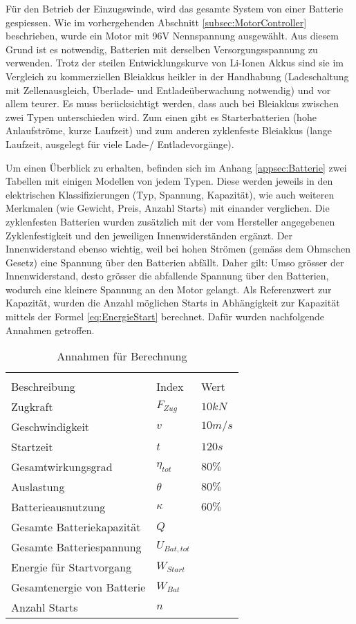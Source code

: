 Für den Betrieb der Einzugswinde, wird das gesamte System von einer Batterie gespiessen. Wie im vorhergehenden Abschnitt \ref{subsec:MotorController} beschrieben, wurde ein Motor mit 96V Nennspannung ausgewählt. Aus diesem Grund ist es notwendig, Batterien mit derselben Versorgungsspannung zu verwenden. Trotz der steilen Entwicklungskurve von Li-Ionen Akkus sind sie im Vergleich zu kommerziellen Bleiakkus heikler in der Handhabung (Ladeschaltung mit Zellenausgleich, Überlade- und Entladeüberwachung notwendig) und vor allem teurer. Es muss berücksichtigt werden, dass auch bei Bleiakkus zwischen zwei Typen unterschieden wird. Zum einen gibt es Starterbatterien (hohe Anlaufströme, kurze Laufzeit) und zum anderen zyklenfeste Bleiakkus (lange Laufzeit, ausgelegt für viele Lade-/ Entladevorgänge).

Um einen Überblick zu erhalten, befinden sich im Anhang \ref{appsec:Batterie} zwei Tabellen mit einigen Modellen von jedem Typen. Diese werden jeweils in den elektrischen Klassifizierungen (Typ, Spannung, Kapazität), wie auch weiteren Merkmalen (wie Gewicht, Preis, Anzahl Starts) mit einander verglichen. Die zyklenfesten Batterien wurden zusätzlich mit der vom Hersteller angegebenen Zyklenfestigkeit und den jeweiligen Innenwiderständen ergänzt. Der Innenwiderstand ebenso wichtig, weil bei hohen Strömen (gemäss dem Ohmschen Gesetz) eine Spannung über den Batterien abfällt. Daher gilt: Umso grösser der Innenwiderstand, desto grösser die abfallende Spannung über den Batterien, wodurch eine kleinere Spannung an den Motor gelangt.
Als Referenzwert zur Kapazität, wurden die Anzahl möglichen Starts in Abhängigkeit zur Kapazität mittels der Formel \ref{eq:EnergieStart} berechnet. Dafür wurden nachfolgende Annahmen getroffen. 

\begin{table}[H]
	\centering
	\begin{tabular}{C{5cm} C{2.5cm} C{2cm}}
		\\
	{Beschreibung} & {Index} & {Wert} \\ \hline
	Zugkraft    &   $ F_{Zug} $    & $10 kN$   \\
	Geschwindigkeit    &   $ v $    & $10 m/s$   \\
	Startzeit    &   $ t $   & $120 s$   \\
	Gesamtwirkungsgrad    &  $ \eta_{tot} $    & $80\%$   \\
	Auslastung    &  $ \theta $   & $80\%$  \\
	Batterieausnutzung    &  $ \kappa $    & $60\%$   \\
	Gesamte Batteriekapazität   &   $ Q $    &   \\
	Gesamte Batteriespannung    &   $ U_{Bat,tot} $    &   \\
	Energie für Startvorgang    &   $ W_{Start} $    &   \\
	Gesamtenergie von Batterie   &   $ W_{Bat} $    &   \\
	Anzahl Starts    &   $ n $    &    \\	
	\end{tabular}
	\caption{Annahmen für Berechnung}
	\label{tab:BerechnungAnzahlStart}
\end{table}

